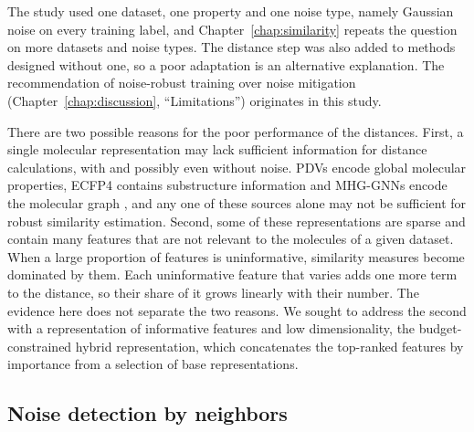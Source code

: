 The study used one dataset, one property and one noise type, namely Gaussian noise on every training label, and Chapter~\ref{chap:similarity} repeats the question on more datasets and noise types. The distance step was also added to methods designed without one, so a poor adaptation is an alternative explanation. The recommendation of noise-robust training over noise mitigation (Chapter~\ref{chap:discussion}, ``Limitations'') originates in this study.

There are two possible reasons for the poor performance of the distances. First, a single molecular representation may lack sufficient information for distance calculations, with and possibly even without noise. PDVs encode global molecular properties, ECFP4 contains substructure information and MHG-GNNs encode the molecular graph \citep{kishimoto2023}, and any one of these sources alone may not be sufficient for robust similarity estimation. Second, some of these representations are sparse and contain many features that are not relevant to the molecules of a given dataset. When a large proportion of features is uninformative, similarity measures become dominated by them. Each uninformative feature that varies adds one more term to the distance, so their share of it grows linearly with their number. The evidence here does not separate the two reasons. We sought to address the second with a representation of informative features and low dimensionality, the budget-constrained hybrid representation, which concatenates the top-ranked features by importance from a selection of base representations.


\subsection{Noise detection by neighbors}\label{sec:flaws:neighbors} %

